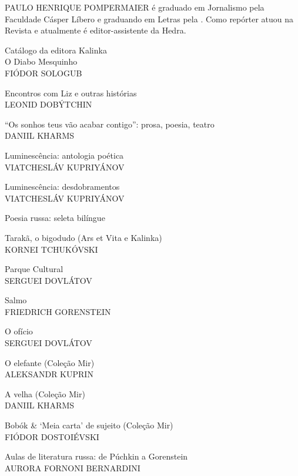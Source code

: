 \medskip

\noindent{}PAULO HENRIQUE POMPERMAIER é graduado em Jornalismo pela Faculdade Cásper Líbero e graduando em Letras pela . Como repórter atuou na Revista  e atualmente é editor-assistente da Hedra.

\afterpage{\blankpage}

\newpage
\pagestyle{empty}
\MyriadPro

\noindent{}Catálogo da editora Kalinka\\[5pt]

\noindent{}O Diabo Mesquinho\\
FIÓDOR SOLOGUB
\medskip

\noindent{}Encontros com Liz e outras histórias\\
LEONID DOBÝTCHIN
\medskip

\noindent{}``Os sonhos teus vão acabar contigo'': prosa, poesia, teatro\\
DANIIL KHARMS
\medskip

\noindent{}Luminescência: antologia poética\\
VIATCHESLÁV KUPRIYÁNOV
\medskip

\noindent{}Luminescência: desdobramentos\\
VIATCHESLÁV KUPRIYÁNOV
\medskip

\noindent{}Poesia russa: seleta bilíngue
\medskip

\noindent{}Tarakã, o bigodudo (Ars et Vita e Kalinka)\\
KORNEI TCHUKÓVSKI
\medskip

\noindent{}Parque Cultural\\
SERGUEI DOVLÁTOV
\medskip

\noindent{}Salmo\\
FRIEDRICH GORENSTEIN
\medskip

\noindent{}O ofício\\
SERGUEI DOVLÁTOV
\medskip

\noindent{}O elefante (Coleção Mir)\\
ALEKSANDR KUPRIN
\medskip

\noindent{}A velha (Coleção Mir)\\
DANIIL KHARMS 
\medskip

\noindent{}Bobók \& `Meia carta' de sujeito (Coleção Mir)\\
FIÓDOR DOSTOIÉVSKI
\medskip

\noindent{}Aulas de literatura russa: de Púchkin a Gorenstein \\
AURORA FORNONI BERNARDINI
\medskip


